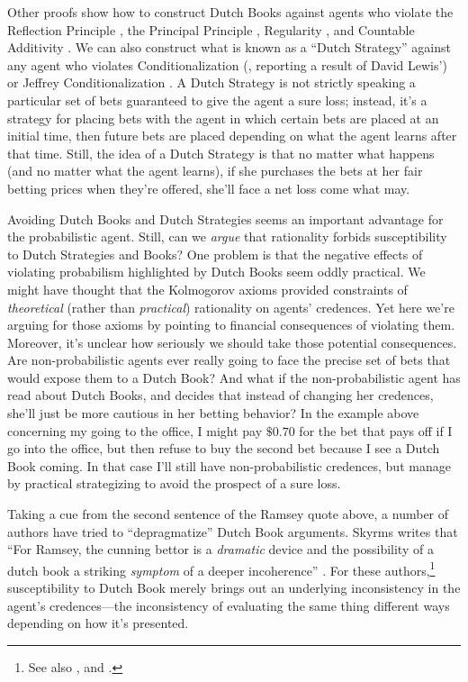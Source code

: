Other proofs show how to construct Dutch Books against agents who violate the Reflection Principle \citep{vanFraassenWill}, the Principal Principle \citep{HowsonDutch}, Regularity \citep{KemenyFairBets,ShimonyAxioms}, and Countable Additivity \citep{AdamsRational}. We can also construct what is known as a ``Dutch Strategy'' against any agent who violates Conditionalization (\citealp{TellerCondObs}, reporting a result of David Lewis') or Jeffrey Conditionalization \citep{ArmendtKinematics,SkyrmsDynamic}. A Dutch Strategy is not strictly speaking a particular set of bets guaranteed to give the agent a sure loss; instead, it's a strategy for placing bets with the agent in which certain bets are placed at an initial time, then future bets are placed depending on what the agent learns after that time. Still, the idea of a Dutch Strategy is that no matter what happens (and no matter what the agent learns), if she purchases the bets at her fair betting prices when they're offered, she'll face a net loss come what may.

Avoiding Dutch Books and Dutch Strategies seems an important advantage for the probabilistic agent. Still, can we \emph{argue} that rationality forbids susceptibility to Dutch Strategies and Books? One problem is that the negative effects of violating probabilism highlighted by Dutch Books seem oddly practical. We might have thought that the Kolmogorov axioms provided constraints of \emph{theoretical} (rather than \emph{practical}) rationality on agents' credences. Yet here we're arguing for those axioms by pointing to financial consequences of violating them. Moreover, it's unclear how seriously we should take those potential consequences. Are non-probabilistic agents ever really going to face the precise set of bets that would expose them to a Dutch Book? And what if the non-probabilistic agent has read about Dutch Books, and decides that instead of changing her credences, she'll just be more cautious in her betting behavior?  In the example above concerning my going to the office, I might pay $\$0.70$ for the bet that pays off if I go into the office, but then refuse to buy the second bet because I see a Dutch Book coming. In that case I'll still have non-probabilistic credences, but manage by practical strategizing to avoid the prospect of a sure loss.

Taking a cue from the second sentence of the Ramsey quote above, a number of authors have tried to ``depragmatize'' Dutch Book arguments. Skyrms writes that ``For Ramsey, the cunning bettor is a \emph{dramatic} device and the possibility of a dutch book a striking \emph{symptom} of a deeper incoherence'' \citep[p.\ 227, emphases mine]{SkyrmsCoherence}. For these authors,\footnote
{See also \citet{ArmendtDutch,ChristensenPlace}, and \citet{HowsonUrbach}.
} susceptibility to Dutch Book merely brings out an underlying inconsistency in the agent's credences---the inconsistency of evaluating the same thing different ways depending on how it's presented.

